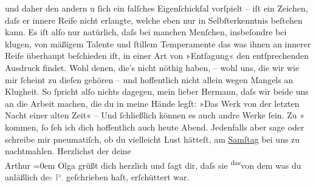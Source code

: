 \begin{ledgroupsized}[t]{13cm}
               und daher den andern u ſich ein \introOben{}falſches\introOben{} Eigenſchickſal
               vorſpielt – iſt ein Zeichen, daſs er innere Reife nicht erlangte, welche eben nur in
               Selbſterkenntnis beſtehen kann.  Es iſt {\pb}alſo nur natürlich,
               daſs bei manchen Menſchen, insbeſondre bei klugen, von mäßigem Talente und ſtillem
               Temperamente das was ihnen an innerer Reife überhaupt beſchieden iſt, in einer Art
               von »Entſagung« den entſprechenden Ausdruck findet.\pend
           \pstart
           Wohl denen, die’s nicht nöthig haben, – wohl uns, die wir wie mir ſcheint zu dieſen
               gehören – und hoffentlich nicht allein wegen Mangels an Klugheit. So ſpricht alſo
               nichts dagegen, mein lieber Hermann, daſs wir beide uns an die Arbeit machen, die du
               in meine {\pb}Hände legſt:
                  »\label{LL075-1v}Das Werk von der letzten Nacht einer alten
                  Zeit\label{LL075-1h}« – Und ſchließlich können es auch andre Werke ſein.\pend
           \pstart
           Zu »\label{K_L01477_3v}\label{K_L01477_3h}{ }kommen, ſo ſeh ich dich hoffentlich auch heute Abend.\pend
           \pstart
           Jedenfalls aber sage oder schreibe mir pneumatiſch, ob du vielleicht Lust hätteſt, am
                  \uline{Samſtag} bei uns zu nachtmahlen.\pend
           \pstart
           Herzlichst der deine{\\[\baselineskip]}\spacefill\mbox{Arthur{\pb}}\pend
           \leftskip=0em{}\pstart
           \noindent{}Olga grüßt dich herzlich und ſagt dir, daſs sie \substVorne{}\textsuperscript{das}\substDazwischen{}von dem\substHinten{} was du anläßlich de\textcolor{gray}{s \textsc{P}.}
                  geſchrieben haſt, erſchüttert war.\pend
           \endnumbering{}\end{ledgroupsized}  \newcommand{\dateiname}{L01477}\newcommand{\titel}{Arthur Schnitzler an Hermann Bahr, 14. 12. 1904}\newcommand{\editorInnen}{ Kurt Ifkovits,  Martin Anton Müller}
            \footnotesize
\begin{ledgroupsized}[t]{11.5cm}
\end{ledgroupsized}
         
      